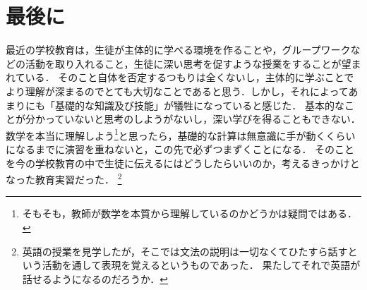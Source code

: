 \documentclass{jlreq}
\begin{document}
\section{最後に}
最近の学校教育は，生徒が主体的に学べる環境を作ることや，グループワークなどの活動を取り入れること，生徒に深い思考を促すような授業をすることが望まれている．
そのこと自体を否定するつもりは全くないし，主体的に学ぶことでより理解が深まるのでとても大切なことであると思う．しかし，それによってあまりにも「基礎的な知識及び技能」が犠牲になっていると感じた．
基本的なことが分かっていないと思考のしようがないし，深い学びを得ることもできない．
数学を本当に理解しよう\footnote{そもそも，教師が数学を本質から理解しているのかどうかは疑問ではある．}と思ったら，基礎的な計算は無意識に手が動くくらいになるまでに演習を重ねないと，この先で必ずつまずくことになる．
そのことを今の学校教育の中で生徒に伝えるにはどうしたらいいのか，考えるきっかけとなった教育実習だった．
\footnote{英語の授業を見学したが，そこでは文法の説明は一切なくてひたすら話すという活動を通して表現を覚えるというものであった．
果たしてそれで英語が話せるようになるのだろうか．}
\end{document}
